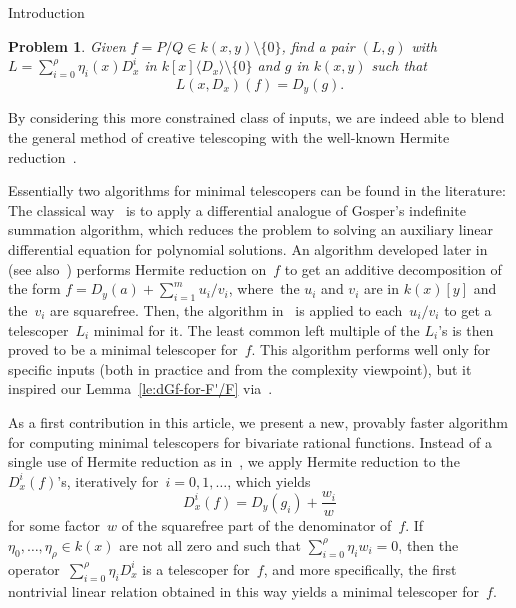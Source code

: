 \documentclass{sig-alt-full}
\newtheorem{problem}{Problem} \renewcommand{\theproblem}{}
\begin{document}
\begin{section}{Introduction}
\begin{problem}
Given $f=P/Q\in k(x, y)\setminus \{0\}$, find a pair $(L, g)$ with
$L = \sum_{i=0}^\rho \eta_i(x)D_x^i$ in $k[x]\langle D_x \rangle
\setminus \{0\}$ and $g$ in $k(x, y)$ such that
\begin{equation}\label{eq:CT}
L(x, D_x)(f) = D_y(g).
\end{equation}
\end{problem}

By considering this more constrained class of inputs, we are indeed
able to blend the general method of creative telescoping with the
well-known Hermite reduction~\cite{Hermite1872}.

Essentially two algorithms for minimal telescopers can be
found in the literature:
The classical way~\cite{Almkvist1990}
is to apply a differential analogue of Gosper's indefinite summation
algorithm, which reduces the problem to solving an auxiliary linear
differential equation for polynomial solutions.
An algorithm developed later in~\cite{GeddesLe2002} (see
also~\cite{Le2000}) performs Hermite reduction on~$f$ to get an
additive decomposition of the form $f = D_y(a) + \sum_{i=1}^m
u_i/v_i$, where~the $u_i$ and $v_i$ are in $k(x)[y]$ and the~$v_i$
are squarefree. Then, the algorithm in~\cite{Almkvist1990} is
applied to each~$u_i/v_i$ to get a telescoper~$L_i$ minimal for it.
The least common left multiple of the $L_i$'s is then proved to be a
minimal telescoper for~$f$. This algorithm performs well only for
specific inputs (both in practice and from the complexity
viewpoint), but it inspired our Lemma~\ref{le:dGf-for-F'/F}
via~\cite{Le2000}.

As a first contribution in this article, we present a new, provably
faster algorithm for computing minimal telescopers for bivariate
rational functions.
Instead of a single use of Hermite reduction as in~\cite{Le2000}, we apply
Hermite reduction to the $D_x^i(f)$'s, iteratively for~$i=0,1,\dots$,
which yields
\begin{equation} \label{EQ:incremental}
 D_x^i (f)  =  D_y (g_i) + \frac{w_i}{w}
\end{equation}
for some factor~$w$ of the squarefree part of the denominator of~$f$.
If $\eta_0, \ldots, \eta_\rho \in k(x)$ are not all zero and such that
$\sum_{i=0}^\rho \eta_i w_i = 0$, then the operator~$\sum_{i=0}^\rho
\eta_i D_x^i$ is a telescoper for~$f$, and more specifically, the first nontrivial linear
relation obtained in this way yields a minimal telescoper for~$f$.


\end{section}
\end{document}

